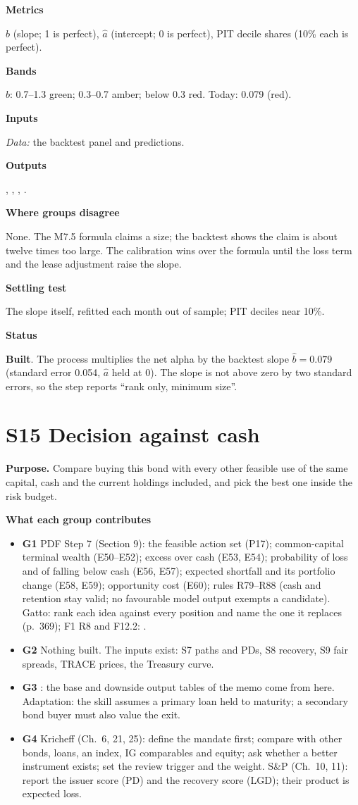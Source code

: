 \documentclass[11pt]{article}
\newcommand{\stbuilt}{\textcolor{good}{\textbf{Built}}}
\newcommand{\GA}{\textcolor{gA}{\textbf{G1}}}
\newcommand{\GB}{\textcolor{gB}{\textbf{G2}}}
\newcommand{\GC}{\textcolor{gC}{\textbf{G3}}}
\newcommand{\GD}{\textcolor{gD}{\textbf{G4}}}
\newcommand{\fld}[1]{\par\medskip\noindent\textbf{\textcolor{steel}{#1}}\par\nopagebreak}
\begin{document}
\fld{Metrics} $\hat b$ (slope; 1 is perfect), $\hat a$ (intercept; 0 is perfect), PIT decile shares (10\% each is perfect).

\fld{Bands} $\hat b$: 0.7--1.3 green; 0.3--0.7 amber; below 0.3 red. Today: 0.079 (red).

\fld{Inputs} \emph{Data:} the backtest panel and predictions. \fld{Outputs} , , , .

\fld{Where groups disagree} None. The M7.5 formula claims a size; the backtest shows the claim is about twelve times too large. The calibration wins over the formula until the loss term and the lease adjustment raise the slope.

\fld{Settling test} The slope itself, refitted each month out of sample; PIT deciles near 10\%.

\fld{Status} \stbuilt. The process multiplies the net alpha by the backtest slope $\hat b = 0.079$ (standard error 0.054, $\hat a$ held at 0). The slope is not above zero by two standard errors, so the step reports ``rank only, minimum size''.

\section{S15 Decision against cash}\label{s15}

\textbf{Purpose.} Compare buying this bond with every other feasible use of the same capital, cash and the current holdings included, and pick the best one inside the risk budget.

\fld{What each group contributes}
\begin{itemize}
\item \GA{} PDF Step 7 (Section 9): the feasible action set (P17); common-capital terminal wealth (E50--E52); excess over cash (E53, E54); probability of loss and of falling below cash (E56, E57); expected shortfall and its portfolio change (E58, E59); opportunity cost (E60); rules R79--R88 (cash and retention stay valid; no favourable model output exempts a candidate). Gatto: rank each idea against every position and name the one it replaces (p.~369); F1 R8 and F12.2: .
\item \GB{} Nothing built. The inputs exist: S7 paths and PDs, S8 recovery, S9 fair spreads, TRACE prices, the Treasury curve.
\item \GC{} : the base and downside output tables of the memo come from here. Adaptation: the skill assumes a primary loan held to maturity; a secondary bond buyer must also value the exit.
\item \GD{} Kricheff (Ch.~6, 21, 25): define the mandate first; compare with other bonds, loans, an index, IG comparables and equity; ask whether a better instrument exists; set the review trigger and the weight. S\&P (Ch.~10, 11): report the issuer score (PD) and the recovery score (LGD); their product is expected loss.
\end{itemize}
\end{document}
